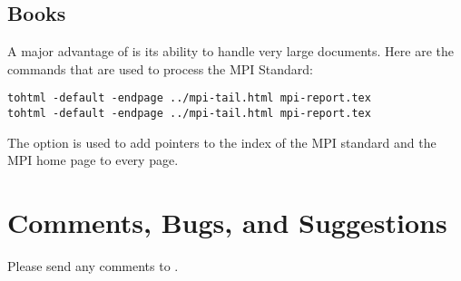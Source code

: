 \documentclass[twoside]{doctext/linfoem}
\begin{document}
\subsection{Books}
A major advantage of  is its ability to handle very large
documents.  Here are the commands that are used to process the MPI Standard:
\begin{verbatim}
tohtml -default -endpage ../mpi-tail.html mpi-report.tex
tohtml -default -endpage ../mpi-tail.html mpi-report.tex
\end{verbatim}
The  option is used to add pointers to the
index of the MPI standard and the MPI home page to every page.

\section{Comments, Bugs, and Suggestions}
Please send any comments to .

\begin{tex}

\end{tex}
\end{document}
